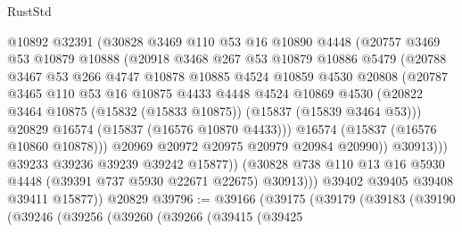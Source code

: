 \begin{lexlean}{RustStd}
\begin{coremodule}
{\begin{coremodule}
{{{{{{{{{{{{{{{{{{{{{{{{{{{{{{{{{{{{{{{{{{{{{{{{{{{{{{{{{{{{                    @10892
                    @32391
                    (@30828
                      @3469
                      @110
                      @53
                      @16
                      @10890
                      @4448
                      (@20757
                        @3469
                        @53
                        @10879
                        @10888
                        (@20918
                          @3468
                          @267
                          @53
                          @10879
                          @10886
                          @5479
                          (@20788
                            @3467
                            @53
                            @266
                            @4747
                            @10878
                            @10885
                            @4524
                            @10859
                            @4530
                            @20808
                            (@20787
                              @3465
                              @110
                              @53
                              @16
                              @10875
                              @4433
                              @4448
                              @4524
                              @10869
                              @4530
                              (@20822
                                @3464
                                @10875
                                (@15832 (@15833 @10875))
                                (@15837 (@15839 @3464 @53)))
                              @20829
                              @16574
                              (@15837 (@16576 @10870 @4433)))
                            @16574
                            (@15837 (@16576 @10860 @10878)))
                          @20969
                          @20972
                          @20975
                          @20979
                          @20984
                          @20990))
                      @30913)))
                @39233
                @39236
                @39239
                @39242
                @15877))
            (@30828 @738 @110 @13 @16 @5930 @4448 (@39391 @737 @5930 @22671 @22675) @30913)))
        @39402
        @39405
        @39408
        @39411
        @15877))
    @20829
@39796 := @39166
    (@39175
      (@39179
        (@39183
          (@39190
            (@39246
              (@39256
                (@39260
                  (@39266
                    (@39415
                      (@39425
}}}}}}}}}}}}}}}}}}}}}}}}}}}}}}}}}}}}}}}}}}}}}}}}}}}}}}}}}}}}
\end{coremodule}}
\end{coremodule}
\end{lexlean}
